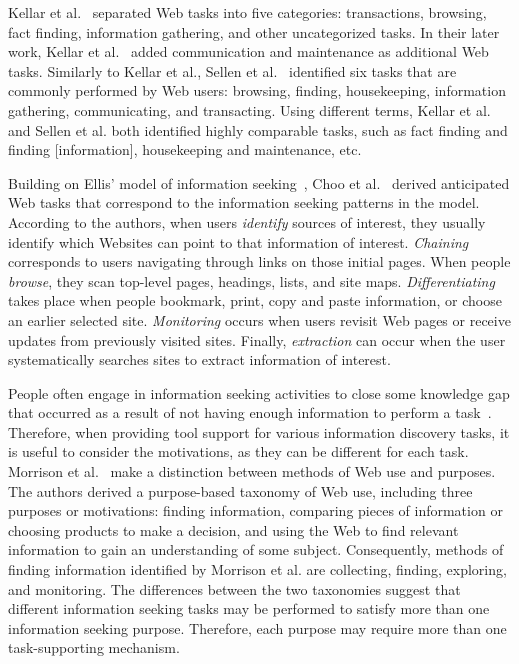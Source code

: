 {{{Kellar et al.~\cite{kellar2006goal} separated Web tasks into five categories: transactions, browsing, fact finding, information gathering, and other uncategorized tasks. In their later work, Kellar et al.~\cite{kellar2007field} added communication and maintenance as additional Web tasks. Similarly to Kellar et al., Sellen et al.~\cite{sellen2002knowledge} identified six tasks that are commonly performed by Web users: browsing, finding, housekeeping, information gathering, communicating, and transacting. Using different terms, Kellar et al. and Sellen et al. both identified highly comparable tasks, such as fact finding and finding [information], housekeeping and maintenance, etc. 

Building on Ellis' model of information seeking~\cite{ellis1989behavioural,ellis1993comparison,ellis1997modelling}, Choo et al.~\cite{choo2000information} derived anticipated Web tasks that correspond to the information seeking patterns in the model. According to the authors, when users \textit{identify} sources of interest, they usually identify which Websites can point to that information of interest.  \textit{Chaining} corresponds to users navigating through links on those initial pages. When people \textit{browse}, they scan top-level pages, headings, lists, and site maps. \textit{Differentiating} takes place when people bookmark, print, copy and paste information, or choose an earlier selected site. \textit{Monitoring} occurs when users revisit Web pages or receive updates from previously visited sites. Finally, \textit{extraction} can occur when the user systematically searches sites to extract information of interest.  

People often engage in information seeking activities to close some knowledge gap that occurred as a result of not having enough information to perform a task~\cite{proper1999information}. Therefore, when providing tool support for various information discovery tasks, it is useful to consider the motivations, as they can be different for each task. Morrison et al.~\cite{morrison2001taxonomic} make a distinction between methods of Web use and purposes. The authors derived a purpose-based taxonomy of Web use, including three purposes or motivations: finding information, comparing pieces of information or choosing products to make a decision, and using the Web to find relevant information to gain an understanding of some subject. Consequently, methods of finding information identified by Morrison et al. are collecting, finding, exploring, and monitoring. The differences between the two taxonomies suggest that different information seeking tasks may be performed to satisfy more than one information seeking purpose. Therefore, each purpose may require more than one task-supporting mechanism. 

}}}
